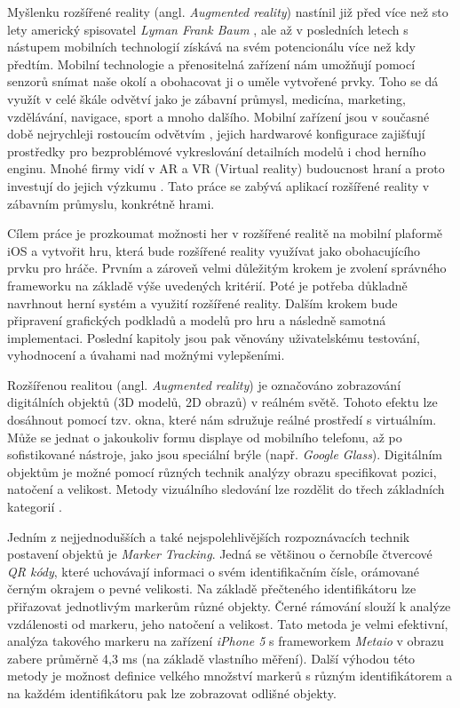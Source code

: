 \documentclass[twoside,12pt]{article}
\begin{document}
% 
Myšlenku rozšířené reality (angl. \textit{Augmented reality}) nastínil již před více než sto lety americký spisovatel \textit{Lyman Frank Baum} \cite{baum}, ale až v posledních letech s nástupem mobilních technologií získává na svém potencionálu více než kdy předtím. Mobilní technologie a přenositelná zařízení nám umožňují pomocí senzorů snímat naše okolí a obohacovat ji o uměle vytvořené prvky. Toho se dá využít v celé škále odvětví jako je zábavní průmysl, medicína, marketing, vzdělávání, navigace, sport a mnoho dalšího. Mobilní zařízení jsou v současné době nejrychleji rostoucím odvětvím \cite{mobile_economy}, jejich hardwarové konfigurace zajišťují prostředky pro bezproblémové vykreslování detailních modelů i chod herního enginu. Mnohé firmy vidí v AR a VR (Virtual reality) budoucnost hraní a proto investují do jejich výzkumu \cite{guardian_samsung}. Tato práce se zabývá aplikací rozšířené reality v zábavním průmyslu, konkrétně hrami. 

% 
Cílem práce je prozkoumat možnosti her v rozšířené realitě na mobilní plaformě iOS a vytvořit hru, která bude rozšířené reality využívat jako obohacujícího prvku pro hráče. Prvním a zároveň velmi důležitým krokem je zvolení správného frameworku na základě výše uvedených kritérií. Poté je potřeba důkladně navrhnout herní systém a využití rozšířené reality. Dalším krokem bude připravení grafických podkladů a modelů pro hru a následně samotná implementaci. Poslední kapitoly jsou pak věnovány uživatelskému testování, vyhodnocení a úvahami nad možnými vylepšeními.

%
%

Rozšířenou realitou (angl. \textit{Augmented reality}) je označováno zobrazování digitálních objektů (3D modelů, 2D obrazů) v reálném světě. Tohoto efektu lze dosáhnout pomocí tzv. okna, které nám sdružuje reálné prostředí s virtuálním. Může se jednat o jakoukoliv formu displaye od mobilního telefonu, až po sofistikované nástroje, jako jsou speciální brýle (např. \textit{Google Glass}). Digitálním objektům je možné pomocí různých technik analýzy obrazu specifikovat pozici, natočení a velikost. Metody vizuálního sledování lze rozdělit do třech základních kategorií \cite{klein_visual_tracking}.

Jedním z nejjednodušších a také nejspolehlivějších rozpoznávacích technik postavení objektů je \textit{Marker Tracking}. Jedná se většinou o černobíle čtvercové \textit{QR kódy}, které uchovávají informaci o svém identifikačním čísle, orámované černým okrajem o pevné velikosti. Na základě přečteného identifikátoru lze přiřazovat jednotlivým markerům různé objekty. Černé rámování slouží k analýze vzdálenosti od markeru, jeho natočení a velikost. Tato metoda je velmi efektivní, analýza takového markeru na zařízení \textit{iPhone 5} s frameworkem \textit{Metaio} v obrazu zabere průměrně 4,3 ms (na základě vlastního měření). Další výhodou této metody je možnost definice velkého množství markerů s různým identifikátorem a na každém identifikátoru pak lze zobrazovat odlišné objekty.
\end{document}
